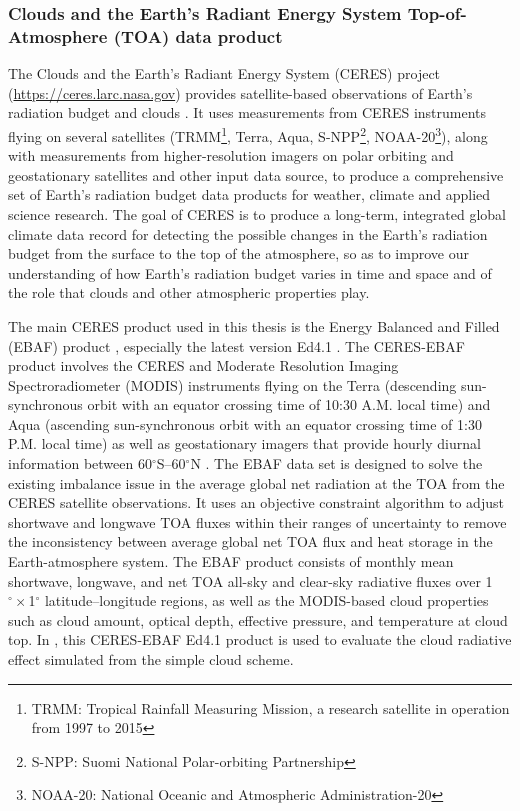 \subsubsection{Clouds and the Earth’s Radiant Energy System  Top-of-Atmosphere (TOA) data product}

The Clouds and the Earth’s Radiant Energy System (CERES) project (\url{https://ceres.larc.nasa.gov})  provides satellite-based observations of Earth's radiation budget and clouds \citep{Wielicki1996clouds}. It uses measurements from CERES instruments flying on several satellites (TRMM\footnote{TRMM: Tropical Rainfall Measuring Mission, a research satellite in operation from 1997 to 2015}, Terra, Aqua, S-NPP\footnote{S-NPP: Suomi National Polar-orbiting Partnership}, NOAA-20\footnote{NOAA-20: National Oceanic and Atmospheric Administration-20}), along with measurements from higher-resolution imagers on polar orbiting and geostationary satellites and other input data source, to produce a comprehensive set of Earth's radiation budget data products for weather, climate and applied science research. The goal of CERES is to produce a long-term, integrated global climate data record for detecting the possible changes in the Earth’s radiation budget from the surface to the top of the atmosphere, so as to improve our understanding of how Earth’s radiation budget varies in time and space and of the role that clouds and other atmospheric properties play.

The main CERES product used in this thesis is the Energy Balanced and Filled (EBAF) product \citep[CERES-EBAF hereafter;][]{Loeb2009}, especially the latest version Ed4.1 \citep{Loeb2018}. The CERES-EBAF product involves the CERES and Moderate Resolution Imaging Spectroradiometer (MODIS) instruments flying on the Terra (descending sun-synchronous orbit with an equator crossing time of 10:30 A.M. local time) and Aqua (ascending sun-synchronous orbit with an equator crossing time of 1:30 P.M. local time) as well as geostationary imagers that provide hourly diurnal information between 60$^\circ$S--60$^\circ$N \citep{Loeb2018}. The EBAF data set is designed to solve the existing imbalance issue in the average global net radiation at the TOA from the CERES satellite observations. It uses an objective constraint algorithm to adjust shortwave and longwave TOA fluxes within their ranges of uncertainty to remove the inconsistency between average global net TOA flux and heat storage in the Earth-atmosphere system. The EBAF product consists of monthly mean shortwave, longwave, and net TOA all-sky and clear-sky radiative fluxes over 1$^\circ \times$1$^\circ$ latitude–longitude regions, as well as the MODIS-based cloud properties such as cloud amount, optical depth, effective pressure, and temperature at cloud top. In , this CERES-EBAF Ed4.1 product is used to evaluate the cloud radiative effect simulated from the simple cloud scheme.

